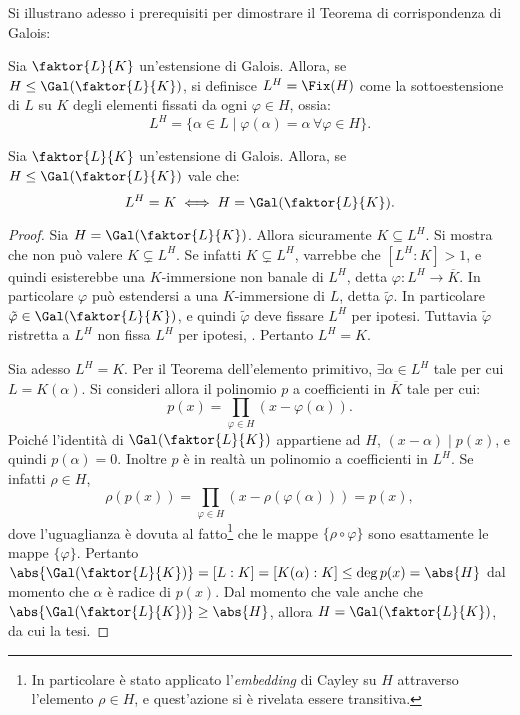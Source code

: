 \documentclass[12pt]{scrartcl}
\begin{document}
	Si illustrano adesso i prerequisiti per dimostrare
	il Teorema di corrispondenza di Galois:
	
	\begin{definition}
		Sia $\faktor{L}{K}$ un'estensione di Galois. Allora,
		se $H \leq \Gal(\faktor{L}{K})$, si definisce
		$L^H = \Fix(H)$ come la sottoestensione di $L$ su
		$K$ degli elementi fissati da ogni $\varphi \in H$,
		ossia:
		\[ L^H = \{ \alpha \in L \mid \varphi(\alpha) = \alpha \, \forall \varphi \in H \}. \]
	\end{definition}

	\begin{nlemma}
		Sia $\faktor{L}{K}$ un'estensione di Galois. Allora,
		se $H \leq \Gal(\faktor{L}{K})$ vale che:
		\[ L^H = K \iff H = \Gal(\faktor{L}{K}). \]
	\end{nlemma}

	\begin{proof}
		Sia $H = \Gal(\faktor{L}{K})$. Allora sicuramente
		$K \subseteq L^H$. Si mostra che non può valere
		$K \subsetneq L^H$. Se infatti $K \subsetneq L^H$,
		varrebbe che $[L^H : K] > 1$, e quindi esisterebbe
		una $K$-immersione non banale di $L^H$, detta
		$\varphi : L^H \to \overline{K}$. In particolare
		$\varphi$ può estendersi a una $K$-immersione di
		$L$, detta $\tilde{\varphi}$. In particolare
		$\tilde{\varphi} \in \Gal(\faktor{L}{K})$, e
		quindi $\tilde{\varphi}$ deve fissare $L^H$ per
		ipotesi. Tuttavia $\tilde{\varphi}$ ristretta
		a $L^H$ non fissa $L^H$ per ipotesi, \Lightning.
		Pertanto $L^H = K$. \medskip
		
		
		Sia adesso $L^H = K$. Per il Teorema dell'elemento
		primitivo, $\exists \alpha \in L^H$ tale per cui
		$L = K(\alpha)$. Si consideri allora il
		polinomio $p$ a coefficienti in $\overline{K}$ tale
		per cui:
		\[ p(x) = \prod_{\varphi \in H} (x - \varphi(\alpha)). \]
		Poiché l'identità di $\Gal(\faktor{L}{K})$ appartiene
		ad $H$, $(x-\alpha) \mid p(x)$, e quindi
		$p(\alpha) = 0$. Inoltre $p$ è in realtà un polinomio
		a coefficienti in $L^H$. Se infatti $\rho \in H$,
		\[ \rho(p(x)) = \prod_{\varphi \in H} (x - \rho(\varphi(\alpha))) = p(x), \]
		dove l'uguaglianza è dovuta al fatto\footnote{
			In particolare è stato applicato l'\textit{embedding} di Cayley su $H$
			attraverso l'elemento $\rho \in H$, e
			quest'azione si è rivelata essere transitiva.
		} che le
		mappe $\{ \rho \circ \varphi \}$ sono esattamente le
		mappe $\{ \varphi \}$. Pertanto $\abs{\Gal(\faktor{L}{K})} = [L : K] =
		[K(\alpha) : K] \leq \deg p(x) = \abs{H}$ dal
		momento che $\alpha$ è radice di $p(x)$. Dal momento
		che vale anche che $\abs{\Gal(\faktor{L}{K})} \geq \abs{H}$, allora
		$H = \Gal(\faktor{L}{K})$, da cui la tesi.
	\end{proof}
\end{document}
